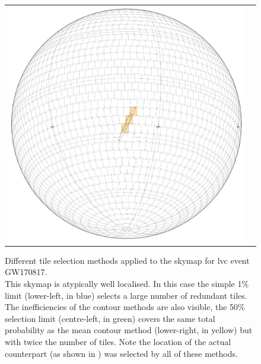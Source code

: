 \begin{colsection}
\begin{colsection}
\begin{figure}[p]
\begin{center}
\begin{tabular}{cc}
            \includegraphics[width=0.25\linewidth]{images/tiling/2_b.png} \\
        \end{tabular}
    \end{center}
    \caption[Different tile selection methods for GW170817]{
        Different tile selection methods applied to the skymap for \gls{lvc} event GW170817.\\
        This skymap is atypically well localised. In this case the simple 1\% limit (lower-left, in blue) selects a large number of redundant tiles. The inefficiencies of the contour methods are also visible, the 50\% selection limit (centre-left, in green) covers the same total probability as the mean contour method (lower-right, in yellow) but with twice the number of tiles. Note the location of the actual counterpart (as shown in ) was selected by all of these methods.
    }\label{fig:tiling_GW170817}
\end{figure}

\newpage


\end{colsection}
\end{colsection}
